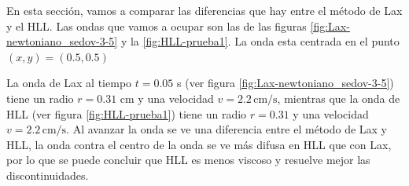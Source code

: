 \documentclass[12pt,a4paper]{book}
\begin{document}
En esta sección, vamos a comparar las diferencias que hay entre el método de Lax y el HLL. Las ondas que vamos a ocupar son las de las figuras \ref{fig:Lax-newtoniano_sedov-3-5} y la \ref{fig:HLL-prueba1}. La onda esta centrada en el punto $(x,y)=(0.5,0.5)$



La onda de Lax al tiempo  $t = 0.05$ s (ver figura \ref{fig:Lax-newtoniano_sedov-3-5}) tiene un radio $r=0.31$ cm y una velocidad $v = 2.2 \, \mathrm{cm}/\mathrm{s}$, mientras que la onda de HLL (ver figura \ref{fig:HLL-prueba1}) tiene un radio $r = 0.31$ y una velocidad $v = 2.2 \, \mathrm{cm}/\mathrm{s}$. Al avanzar la onda se ve una diferencia entre el método de Lax y HLL, la onda contra el centro de la onda se ve más difusa en HLL que con Lax, por lo que se puede concluir que HLL es menos viscoso y resuelve mejor las discontinuidades.
\end{document}

